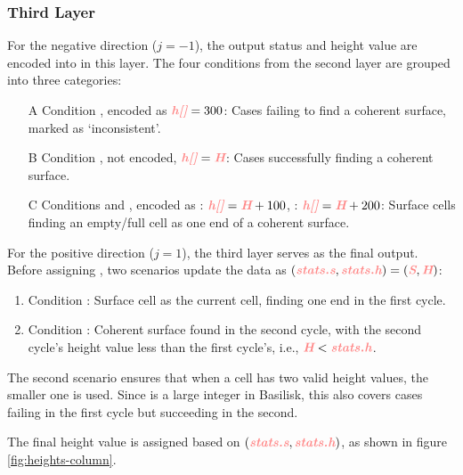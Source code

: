 \subsubsection{Third Layer}\label{sec:heights-thirdl}
For the negative direction ($j=-1$), the output status and height value are encoded into  in this layer. The four conditions from the second layer are grouped into three categories:
\begin{itemize}
    \item[A] Condition , encoded as $\para{h[]}=300$: Cases failing to find a coherent surface, marked as `inconsistent'.
    \item[B] Condition , not encoded, $\para{h[]}=\para{H}$: Cases successfully finding a coherent surface.
    \item[C] Conditions  and , encoded as : $\para{h[]}=\para{H}+100$, : $\para{h[]}=\para{H}+200$: Surface cells finding an empty/full cell as one end of a coherent surface.
\end{itemize}

For the positive direction ($j=1$), the third layer serves as the final output. Before assigning , two scenarios update the data as $(\para{stats.s},\para{stats.h})=(\para{S},\para{H})$:
\begin{enumerate}
    \item Condition : Surface cell as the current cell, finding one end in the first cycle.
    \item Condition : Coherent surface found in the second cycle, with the second cycle’s height value less than the first cycle’s, i.e., $\para{H}<\para{stats.h}$.
\end{enumerate}
The second scenario ensures that when a cell has two valid height values, the smaller one is used. Since  is a large integer in Basilisk, this also covers cases failing in the first cycle but succeeding in the second.

The final height value  is assigned based on $(\para{stats.s},\para{stats.h})$, as shown in figure \ref{fig:heights-column}.


